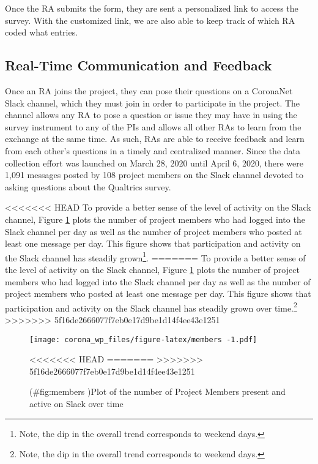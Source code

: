 \documentclass[]{article}
\let\rmarkdownfootnote\footnote%
\def\footnote{\protect\rmarkdownfootnote}
\begin{document}
Once the RA submits the form, they are sent a personalized link to access the survey. With the customized link, we are also able to keep track of which RA coded what entries.

\hypertarget{real-time-communication-and-feedback}{%
\subsection{Real-Time Communication and Feedback}\label{real-time-communication-and-feedback}}

Once an RA joins the project, they can pose their questions on a CoronaNet Slack channel, which they must join in order to participate in the project. The channel allows any RA to pose a question or issue they may have in using the survey instrument to any of the PIs and allows all other RAs to learn from the exchange at the same time. As such, RAs are able to receive feedback and learn from each other's questions in a timely and centralized manner. Since the data collection effort was launched on March 28, 2020 until April 6, 2020, there were 1,091 messages posted by 108 project members on the Slack channel devoted to asking questions about the Qualtrics survey.

<<<<<<< HEAD
To provide a better sense of the level of activity on the Slack channel, Figure \ref{fig:members} plots the number of project members who had logged into the Slack channel per day as well as the number of project members who posted at least one message per day. This figure shows that participation and activity on the Slack channel has steadily grown\footnote{Note, the dip in the overall trend corresponds to weekend days.}.
=======
To provide a better sense of the level of activity on the Slack channel, Figure \ref{fig:members} plots the number of project members who had logged into the Slack channel per day as well as the number of project members who posted at least one message per day. This figure shows that participation and activity on the Slack channel has steadily grown over time.\footnote{Note, the dip in the overall trend corresponds to weekend days.}
>>>>>>> 5f16de2666077f7eb0e17d9be1d14f4ee43e1251

\begin{figure}
\centering
\texttt{[image: corona\_wp\_files/figure-latex/members -1.pdf]}
\caption{(\#fig:members )Plot of the number of Project Members present and active on Slack over time}
<<<<<<< HEAD
=======
\label{fig:members}
>>>>>>> 5f16de2666077f7eb0e17d9be1d14f4ee43e1251
\end{figure}
\end{document}
